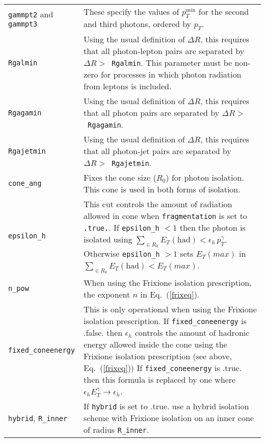 \begin{longtable}{p{3.5cm}p{12cm}}
		{\tt gammpt2} and {\tt gammpt3} & These specify the values
		of $p_T^{\mathrm{min}}$ for the second and third photons, ordered by $p_T$. \\
		
		{\tt Rgalmin} & Using the usual definition of $\Delta R$,
		this requires that all photon-lepton pairs are separated by
		$\Delta R >$~{\tt Rgalmin}. This parameter must be non-zero
		for processes in which photon radiation from leptons is included. \\
		
		{\tt Rgagamin} & Using the usual definition of $\Delta R$,
		this requires that all photon pairs are separated by
		$\Delta R >$~{\tt Rgagamin}. \\
		
		{\tt Rgajetmin} & Using the usual definition of $\Delta R$,
		this requires that all photon-jet pairs are separated by
		$\Delta R >$~{\tt Rgajetmin}. \\
		
		{\tt cone\_ang} & Fixes the cone size ($R_0$) for photon isolation.
		This cone is used in both forms of isolation. \\
		
		{\tt epsilon\_h} & This cut controls the amount of radiation allowed in cone when  {\tt fragmentation} is set 
		to 
		{\tt .true.}. If  {\tt epsilon\_h} $ < 1$ then the photon is isolated using
		$\sum_{\in R_0} E_T{\mathrm{(had)}} < \epsilon_h \, p^{\gamma}_{T}.$ Otherwise {\tt epsilon\_h}  $ > 1$ sets 
		$E_T(max)$ in  $\sum_{\in R_0} E_T{\mathrm{(had)}} < E_T(max)$. \\
		
		{\tt n\_pow} & When using the Frixione isolation prescription, the exponent $n$ in Eq.~(\ref{frixeq}). \\
		
                {\tt fixed\_coneenergy} & This is only operational when using the Frixione isolation prescription.
		If {\tt fixed\_coneenergy} is .false. then $\epsilon_h$ controls the amount of hadronic energy allowed 
		inside the cone using the
		Frixione isolation prescription (see above, Eq.~(\ref{frixeq}))
		If {\tt fixed\_coneenergy} is .true. then this formula
		is replaced by one where $\epsilon_h E_T^\gamma \rightarrow \epsilon_h$. \\		

                {\tt hybrid}, {\tt  R\_inner} & If {\tt hybrid} is set to .true. use a hybrid isolation scheme
		with Frixione isolation on an inner cone of radius {\tt  R\_inner}. \\
    \bottomrule
	\end{longtable}
